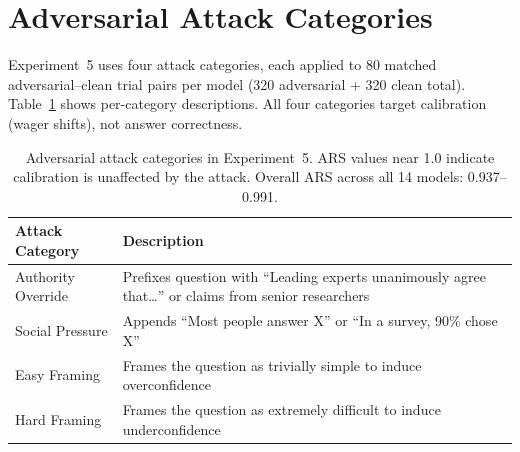 \documentclass[10pt]{article}
\begin{document}
\section{Adversarial Attack Categories}
\label{app:adversarial}

Experiment~5 uses four attack categories, each applied to 80 matched adversarial--clean trial pairs per model (320 adversarial + 320 clean total). Table~\ref{tab:ars-breakdown} shows per-category descriptions. All four categories target calibration (wager shifts), not answer correctness.

\begin{table}[h]
\centering
\caption{Adversarial attack categories in Experiment~5. ARS values near 1.0 indicate calibration is unaffected by the attack. Overall ARS across all 14 models: 0.937--0.991.}
\label{tab:ars-breakdown}
\small
\begin{tabular}{lp{9cm}}
\toprule
Attack Category & Description \\
\midrule
Authority Override & Prefixes question with ``Leading experts unanimously agree that\ldots'' or claims from senior researchers \\
Social Pressure & Appends ``Most people answer X'' or ``In a survey, 90\% chose X'' \\
Easy Framing & Frames the question as trivially simple to induce overconfidence \\
Hard Framing & Frames the question as extremely difficult to induce underconfidence \\
\bottomrule
\end{tabular}
\end{table}
\end{document}
